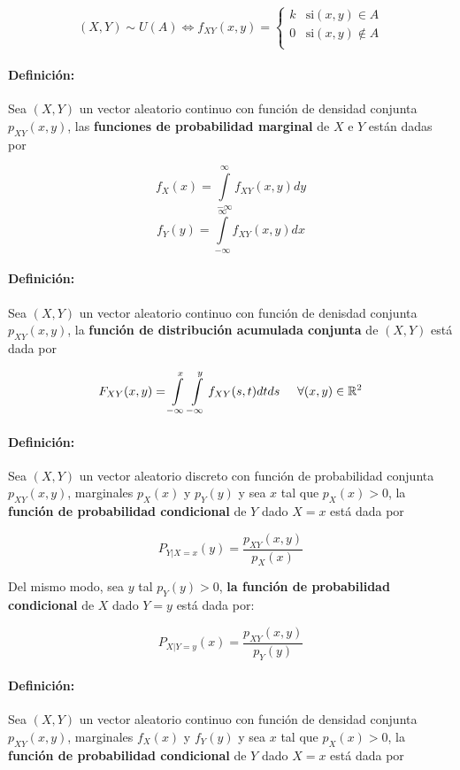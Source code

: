 $$(X,Y)\sim U(A) \iff f_{XY}(x,y) = \left\{ \begin{array}{ll}
k & \text{si} (x,y)\in A\\
0 & \text{si} (x,y)\notin A\\
\end{array}\right.$$
	
\paragraph{Definición:} Sea $(X,Y)$ un vector aleatorio continuo con función de densidad conjunta $p_{XY}(x,y)$, las \textbf{funciones de probabilidad marginal} de $X$ e $Y$ están dadas por
	
	$$f_X(x) = \int\limits_{-\infty}^{\infty} f_{XY}(x,y)dy$$
	$$f_Y(y) = \int\limits_{-\infty}^{\infty} f_{XY}(x,y)dx$$
	
\paragraph{Definición:} Sea $(X,Y)$ un vector aleatorio continuo con función de denisdad conjunta $p_{XY}(x,y)$, la \textbf{función de distribución acumulada conjunta} de $(X,Y)$ está dada por
	
	$$F_{XY}(x,y) = \int\limits_{-\infty}^{x}\int\limits_{-\infty}^{y} f_{XY}(s,t)dtds\hspace*{5mm}\forall(x,y)\in\mathbb{R}^2$$

\paragraph{Definición:} Sea $(X,Y)$ un vector aleatorio discreto con función de probabilidad conjunta $p_{XY}(x,y)$, marginales $p_X(x)$ y $p_Y(y)$ y sea $x$ tal que $p_X(x) > 0$, la \textbf{función de probabilidad condicional} de $Y$ dado $X = x$ está dada por

$$P_{Y | X = x}(y) = \frac{p_{XY}(x,y)}{p_X(x)}$$

Del mismo modo, sea $y$ tal $p_Y(y) > 0$, \textbf{la función de probabilidad condicional} de $X$ dado $Y = y$ está dada por:

$$P_{X | Y = y}(x) = \frac{p_{XY}(x,y)}{p_Y(y)}$$

\paragraph{Definición:} Sea $(X,Y)$ un vector aleatorio continuo con función de densidad conjunta $p_{XY}(x,y)$, marginales $f_X(x)$ y $f_Y(y)$ y sea $x$ tal que $p_X(x) > 0$, la \textbf{función de probabilidad condicional} de $Y$ dado $X = x$ está dada por

